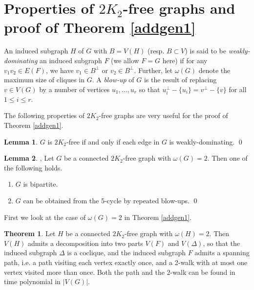 \documentclass{amsart}
\theoremstyle{definition}
\newtheorem{theorem}{Theorem}
\newtheorem{lemma}{Lemma}
\begin{document}
\section{Properties of $2K_2$-free graphs and proof of Theorem \ref{addgen1}}
An induced subgraph $H$ of $G$ with $B=V(H)$ (resp. $B\subset V$) is said to be {\em weakly-dominating}
an induced subgraph $F$ (we allow $F=G$ here) 
if for any $v_1v_2\in E(F)$, we have $v_1\in B^\perp$ or $v_2\in B^\perp$.
Further, let $\omega(G)$ denote the maximum size of cliques in $G$.
A {\em blow-up} of $G$ is the result of replacing $v\in V(G)$ 
by a number of vertices $u_1,\dots,u_r$ so that $u_i^\perp-\{u_i\}=v^\perp-\{v\}$
for all $1\leq i\leq r$.


The following properties of $2K_2$-free graphs are very useful for the proof of Theorem \ref{addgen1}.
\begin{lemma}\label{trivial}
$G$ is $2K_2$-free if and only if each edge in $G$ is weakly-dominating. \qed
\end{lemma}

\begin{lemma}\label{lm1}{\cite[Theorem 2]{chung1990maximum}, \cite[Lemma 2]{broersma2014toughness}}
Let $G$ be a connected $2K_2$-free graph with $\omega(G)=2$. Then one of the following holds. 
\begin{enumerate}
\item $G$ is bipartite.
\item $G$ can be obtained from the 5-cycle by repeated blow-ups. \qed
\end{enumerate}
\end{lemma}

First we look at the case of  $\omega(G)=2$ in Theorem \ref{addgen1}.
\begin{theorem}\label{thm4}
Let $H$ be a connected $2K_2$-free graph with $\omega(H)=2$. 
Then $V(H)$ admits a decomposition into two parts $V(F)$ and $V(\Delta)$, so that the induced subgraph $\Delta$ is a coclique, and the induced subgraph $F$ admits
a spanning path, i.e. a path visiting each vertex exactly once, and 
a 2-walk with at most one vertex visited more than once. Both the path and the 2-walk can be found in time polynomial in $|V(G)|$.
\end{theorem}
\end{document}
